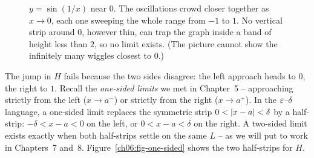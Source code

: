 \begin{figure}[htbp]
\centering
{}
\caption{$y=\sin(1/x)$ near $0$. The oscillations crowd closer together as
$x\to0$, each one sweeping the whole range from $-1$ to $1$. No vertical strip
around $0$, however thin, can trap the graph inside a band of height less than
$2$, so no limit exists. (The picture cannot show the infinitely many wiggles
closest to $0$.)}
\label{ch06:fig-sin}
\end{figure}

\begin{connectionbox}
The jump in $H$ fails because the two sides disagree: the left approach
heads to $0$, the right to $1$. Recall the \emph{one-sided limits} we met in Chapter~5 --
approaching strictly from the left ($x\to a^-$) or strictly from the right ($x\to a^+$).
In the $\varepsilon$--$\delta$ language, a one-sided limit replaces the symmetric strip $0<\lvert x-a\rvert<\delta$
by a half-strip: $-\delta < x-a < 0$ on the left, or $0 < x-a < \delta$ on the right.
A two-sided limit exists exactly when both half-strips settle on the same $L$ -- as we will put to work in Chapters~7 and~8.
Figure~\ref{ch06:fig-one-sided} shows the two half-strips for $H$.
\end{connectionbox}

